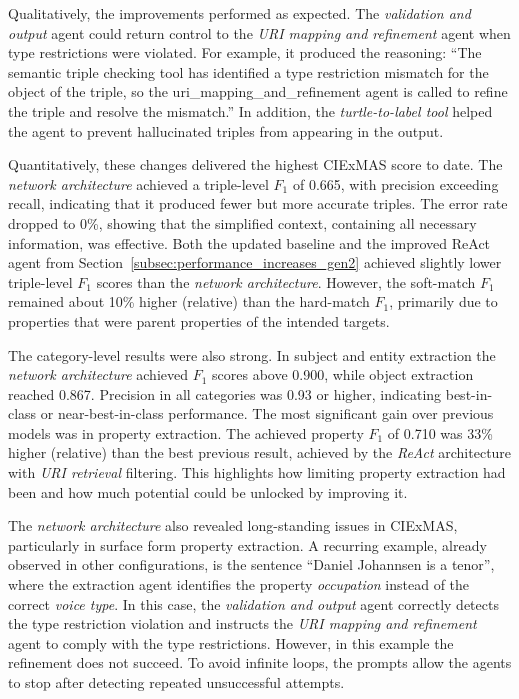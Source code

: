 \documentclass[a4paper,oneside,bibliography=totoc]{scrbook}
\begin{document}
Qualitatively, the improvements performed as expected. The \textit{validation and output} agent could return control to the \textit{\ac{URI} mapping and refinement} agent when type restrictions were violated. For example, it produced the reasoning: \enquote{The semantic triple checking tool has identified a type restriction mismatch for the object of the triple, so the uri\_mapping\_and\_refinement agent is called to refine the triple and resolve the mismatch.} In addition, the \textit{turtle-to-label tool} helped the agent to prevent hallucinated triples from appearing in the output.

Quantitatively, these changes delivered the highest CIExMAS score to date. The \textit{network architecture} achieved a triple-level $F_{1}$ of 0.665, with precision exceeding recall, indicating that it produced fewer but more accurate triples. The error rate dropped to 0\%, showing that the simplified context, containing all necessary information, was effective. Both the updated baseline and the improved ReAct agent from Section~\ref{subsec:performance_increases_gen2} achieved slightly lower triple-level $F_{1}$ scores than the \textit{network architecture}. However, the soft-match $F_{1}$ remained about 10\% higher (relative) than the hard-match $F_{1}$, primarily due to properties that were parent properties of the intended targets.

The category-level results were also strong. In subject and entity extraction the \textit{network architecture} achieved $F_{1}$ scores above 0.900, while object extraction reached 0.867. Precision in all categories was 0.93 or higher, indicating best-in-class or near-best-in-class performance. The most significant gain over previous models was in property extraction. The achieved property $F_{1}$ of 0.710 was 33\% higher (relative) than the best previous result, achieved by the \textit{ReAct} architecture with \textit{\ac{URI} retrieval} filtering. This highlights how limiting property extraction had been and how much potential could be unlocked by improving it.

The \textit{network architecture} also revealed long-standing issues in CIExMAS, particularly in surface form property extraction. A recurring example, already observed in other configurations, is the sentence \enquote{Daniel Johannsen is a tenor}, where the extraction agent identifies the property \textit{occupation} instead of the correct \textit{voice type}. In this case, the \textit{validation and output} agent correctly detects the type restriction violation and instructs the \textit{\ac{URI} mapping and refinement} agent to comply with the type restrictions. However, in this example the refinement does not succeed. To avoid infinite loops, the prompts allow the agents to stop after detecting repeated unsuccessful attempts.
\end{document}
